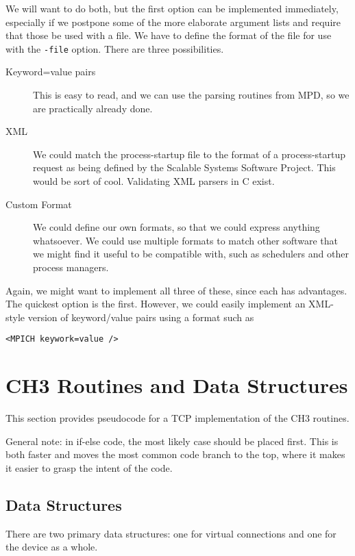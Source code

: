 \documentclass{article}
\def\code{\begingroup\makeustext\eatcode}
\def\eatcode#1{\texttt{#1}\endgroup}
\begin{document}
We will want to do both, but the first option can be implemented
immediately, especially if we postpone some of the more elaborate argument
lists and require that those be used with a file.  We have to define the
format of the file for use with the \code{-file} option.  There are three
possibilities.
\begin{description}
\item[Keyword=value pairs] This is easy to read, and we can use the
  parsing routines from MPD, so we are practically already done.
\item[XML] We could match the process-startup file to the format of a
  process-startup request as being defined by the Scalable Systems Software
  Project.  This would be sort of cool.  Validating XML parsers in C exist.
\item[Custom Format] We could define our own formats, so that we could express
  anything whatsoever.  We could use multiple formats to match other software
  that we might find it useful to be compatible with, such as schedulers and
  other process managers.
\end{description}

Again, we might want to implement all three of these, since each has
advantages.  The quickest option is the first.  However, we could easily
implement an XML-style version of keyword/value pairs using a format such as
\begin{verbatim}
<MPICH keywork=value />
\end{verbatim}



\appendix
\section{CH3 Routines and Data Structures}
\label{app:ch3}

This section provides pseudocode for a TCP implementation of the CH3
routines.

General note: in if-else code, the most likely case should be placed first.
This is both faster and moves the most common code branch to the top, where it
makes it easier to grasp the intent of the code.

\subsection{Data Structures}
There are two primary data structures: one for virtual connections and one for
the device as a whole.
\end{document}
